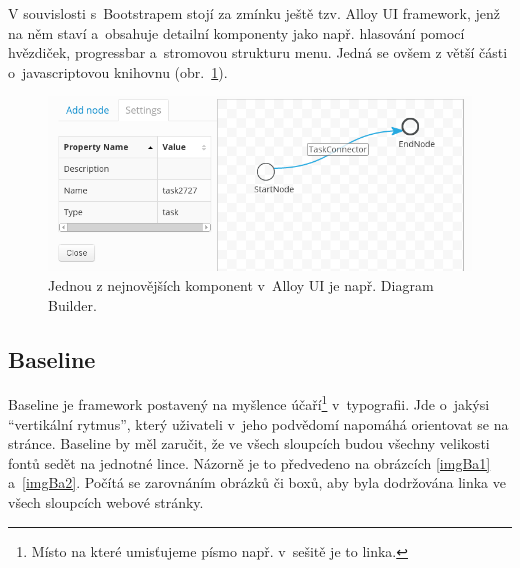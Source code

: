 \documentclass[thesis=B,czech]{FITthesis}[2012/06/26]
\begin{document}
V souvislosti s~Bootstrapem stojí za zmínku ještě tzv. Alloy UI framework, jenž na něm staví a~obsahuje detailní komponenty jako např. hlasování pomocí hvězdiček, progressbar a~stromovou strukturu menu. Jedná se ovšem z větší části o~javascriptovou knihovnu (obr.~\ref{imgAlloy}).

\begin{figure}[h]
	\begin{center}
	\includegraphics[scale=0.7]{images/image13.png}
	\end{center}
	\caption[Alloy UI komponenta]{Jednou z nejnovějších komponent v~Alloy UI je např. Diagram Builder.}
	\label{imgAlloy}
\end{figure}

\newpage
\subsection{Baseline}

Baseline je framework postavený na myšlence účaří\footnote{Místo na které umisťujeme písmo např. v~sešitě je to linka.} v~typografii. Jde o~jakýsi “vertikální rytmus”, který uživateli v~jeho podvědomí napomáhá orientovat se na stránce. Baseline by měl zaručit, že ve všech sloupcích budou všechny velikosti fontů sedět na jednotné lince. Názorně je to předvedeno na obrázcích \ref{imgBa1} a~\ref{imgBa2}\cite{bas}. Počítá se zarovnáním obrázků či boxů, aby byla dodržována linka ve všech sloupcích webové stránky.
\end{document}
